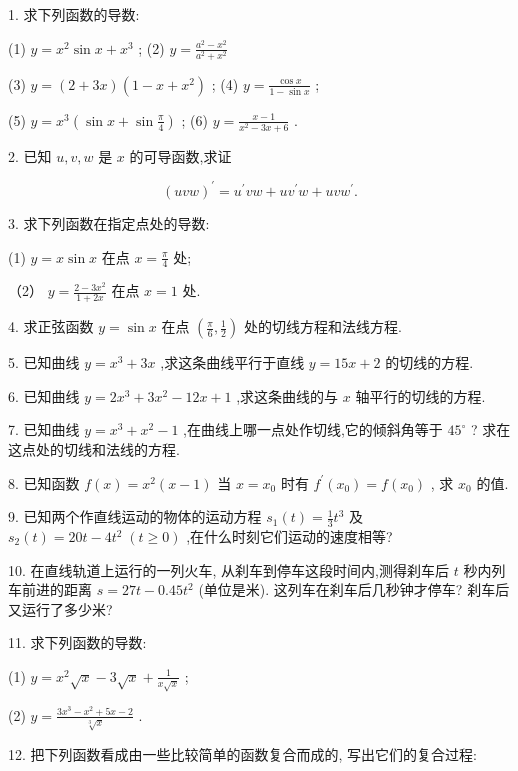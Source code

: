 \documentclass[10pt]{article}
\begin{document}
1. 求下列函数的导数:

(1) \(y = {x}^{2}\sin x + {x}^{3}\) ; (2) \(y = \frac{{a}^{2} - {x}^{2}}{{a}^{2} + {x}^{2}}\)

(3) \(y = \left( {2 + {3x}}\right) \left( {1 - x + {x}^{2}}\right)\) ; (4) \(y = \frac{\cos x}{1 - \sin x}\) ;

(5) \(y = {x}^{3}\left( {\sin x + \sin \frac{\pi }{4}}\right)\) ; (6) \(y = \frac{x - 1}{{x}^{2} - {3x} + 6}\) .

2. 已知 \(u,v,w\) 是 \(x\) 的可导函数,求证

\[
{\left( uvw\right) }^{\prime } = {u}^{\prime }{vw} + u{v}^{\prime }w + {uv}{w}^{\prime }.
\]

3. 求下列函数在指定点处的导数:

(1) \(y = x\sin x\) 在点 \(x = \frac{\pi }{4}\) 处;

（2） \(y = \frac{2 - 3{x}^{2}}{1 + {2x}}\) 在点 \(x = 1\) 处.

4. 求正弦函数 \(y = \sin x\) 在点 \(\left( {\frac{\pi }{6},\frac{1}{2}}\right)\) 处的切线方程和法线方程.

5. 已知曲线 \(y = {x}^{3} + {3x}\) ,求这条曲线平行于直线 \(y = {15x} + 2\) 的切线的方程.

6. 已知曲线 \(y = 2{x}^{3} + 3{x}^{2} - {12x} + 1\) ,求这条曲线的与 \(x\) 轴平行的切线的方程.

7. 已知曲线 \(y = {x}^{3} + {x}^{2} - 1\) ,在曲线上哪一点处作切线,它的倾斜角等于 \({45}^{ \circ }\) ? 求在这点处的切线和法线的方程.

8. 已知函数 \(f\left( x\right) = {x}^{2}\left( {x - 1}\right)\) 当 \(x = {x}_{0}\) 时有 \({f}^{\prime }\left( {x}_{0}\right) = f\left( {x}_{0}\right)\) , 求 \({x}_{0}\) 的值.

9. 已知两个作直线运动的物体的运动方程 \({s}_{1}\left( t\right) = \frac{1}{3}{t}^{3}\) 及 \({s}_{2}\left( t\right) = {20t} - 4{t}^{2}\;\left( {t \geq 0}\right)\) ,在什么时刻它们运动的速度相等?

10. 在直线轨道上运行的一列火车, 从刹车到停车这段时间内,测得刹车后 \(t\) 秒内列车前进的距离 \(s = {27t} - {0.45}{t}^{2}\) (单位是米). 这列车在刹车后几秒钟才停车? 刹车后又运行了多少米?

11. 求下列函数的导数:

(1) \(y = {x}^{2}\sqrt{x} - 3\sqrt{x} + \frac{1}{x\sqrt{x}}\) ;

(2) \(y = \frac{3{x}^{3} - {x}^{2} + {5x} - 2}{\sqrt[3]{x}}\) .

12. 把下列函数看成由一些比较简单的函数复合而成的, 写出它们的复合过程:
\end{document}
